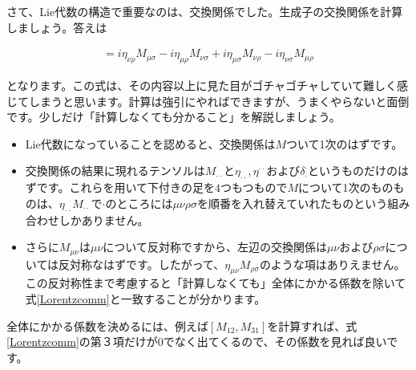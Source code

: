 \documentclass[report,paper=a4, fontsize=12pt, line_length=16cm, number_of_lines=33,dvipdfmx]{jlreq}
\newenvironment{important}{\begin{tcolorbox}[
  colback = white,
  colframe = red!35,
  boxrule = 2mm,
  fonttitle = \bfseries,
  after = \noindent] }{\end{tcolorbox}}
\numberwithin{equation}{chapter}
\begin{document}
さて、Lie代数の構造で重要なのは、交換関係でした。生成子の交換関係を計算しましょう。答えは
\begin{important}
  \begin{align}
    [M_{\mu\nu},M_{\rho\sigma}]=i\eta_{\nu\rho}M_{\mu\sigma}-i\eta_{\mu\rho}M_{\nu\sigma}
    +i\eta_{\mu\sigma}M_{\nu\rho}-i\eta_{\nu\sigma}M_{\mu\rho}\label{Lorentzcomm}
  \end{align}
\end{important}
となります。この式は、その内容以上に見た目がゴチャゴチャしていて難しく感じてしまうと思います。計算は強引にやればできますが、うまくやらないと面倒です。少しだけ「計算しなくても分かること」を解説しましょう。
\begin{itemize}
  \item Lie代数になっていることを認めると、交換関係は$M$ついて1次のはずです。
  \item 交換関係の結果に現れるテンソルは$M_{\cdot\cdot}$と$\eta_{\cdot\cdot},\eta^{\cdot\cdot}$および$\delta^{\cdot}_{\cdot}$というものだけのはずです。これらを用いて下付きの足を$4$つもつもので$M$について1次のものものは、$\eta_{\cdot\cdot}M_{\cdot\cdot}$で$\cdot$のところには$\mu\nu\rho\sigma$を順番を入れ替えていれたものという組み合わせしかありません。
  \item さらに$M_{\mu\nu}$は$\mu\nu$について反対称ですから、左辺の交換関係は$\mu\nu$および$\rho\sigma$については反対称なはずです。したがって、$\eta_{\mu\nu}M_{\rho\sigma}$のような項はありえません。この反対称性まで考慮すると「計算しなくても」全体にかかる係数を除いて式\eqref{Lorentzcomm}と一致することが分かります。
\end{itemize}
全体にかかる係数を決めるには、例えば$[M_{12},M_{31}]$を計算すれば、式\eqref{Lorentzcomm}の第３項だけが$0$でなく出てくるので、その係数を見れば良いです。
\end{document}
